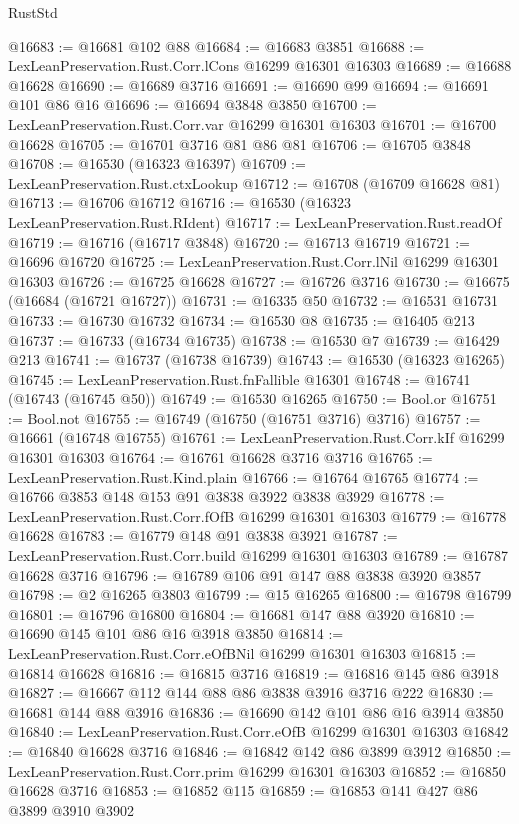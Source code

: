 \begin{lexlean}{RustStd}
\begin{coremodule}
@16683 := @16681 @102 @88
@16684 := @16683 @3851
@16688 := LexLeanPreservation.Rust.Corr.lCons @16299 @16301 @16303
@16689 := @16688 @16628
@16690 := @16689 @3716
@16691 := @16690 @99
@16694 := @16691 @101 @86 @16
@16696 := @16694 @3848 @3850
@16700 := LexLeanPreservation.Rust.Corr.var @16299 @16301 @16303
@16701 := @16700 @16628
@16705 := @16701 @3716 @81 @86 @81
@16706 := @16705 @3848
@16708 := @16530 (@16323 @16397)
@16709 := LexLeanPreservation.Rust.ctxLookup
@16712 := @16708 (@16709 @16628 @81)
@16713 := @16706 @16712
@16716 := @16530 (@16323 LexLeanPreservation.Rust.RIdent)
@16717 := LexLeanPreservation.Rust.readOf
@16719 := @16716 (@16717 @3848)
@16720 := @16713 @16719
@16721 := @16696 @16720
@16725 := LexLeanPreservation.Rust.Corr.lNil @16299 @16301 @16303
@16726 := @16725 @16628
@16727 := @16726 @3716
@16730 := @16675 (@16684 (@16721 @16727))
@16731 := @16335 @50
@16732 := @16531 @16731
@16733 := @16730 @16732
@16734 := @16530 @8
@16735 := @16405 @213
@16737 := @16733 (@16734 @16735)
@16738 := @16530 @7
@16739 := @16429 @213
@16741 := @16737 (@16738 @16739)
@16743 := @16530 (@16323 @16265)
@16745 := LexLeanPreservation.Rust.fnFallible @16301
@16748 := @16741 (@16743 (@16745 @50))
@16749 := @16530 @16265
@16750 := Bool.or
@16751 := Bool.not
@16755 := @16749 (@16750 (@16751 @3716) @3716)
@16757 := @16661 (@16748 @16755)
@16761 := LexLeanPreservation.Rust.Corr.kIf @16299 @16301 @16303
@16764 := @16761 @16628 @3716 @3716
@16765 := LexLeanPreservation.Rust.Kind.plain
@16766 := @16764 @16765
@16774 := @16766 @3853 @148 @153 @91 @3838 @3922 @3838 @3929
@16778 := LexLeanPreservation.Rust.Corr.fOfB @16299 @16301 @16303
@16779 := @16778 @16628
@16783 := @16779 @148 @91 @3838 @3921
@16787 := LexLeanPreservation.Rust.Corr.build @16299 @16301 @16303
@16789 := @16787 @16628 @3716
@16796 := @16789 @106 @91 @147 @88 @3838 @3920 @3857
@16798 := @2 @16265 @3803
@16799 := @15 @16265
@16800 := @16798 @16799
@16801 := @16796 @16800
@16804 := @16681 @147 @88 @3920
@16810 := @16690 @145 @101 @86 @16 @3918 @3850
@16814 := LexLeanPreservation.Rust.Corr.eOfBNil @16299 @16301 @16303
@16815 := @16814 @16628
@16816 := @16815 @3716
@16819 := @16816 @145 @86 @3918
@16827 := @16667 @112 @144 @88 @86 @3838 @3916 @3716 @222
@16830 := @16681 @144 @88 @3916
@16836 := @16690 @142 @101 @86 @16 @3914 @3850
@16840 := LexLeanPreservation.Rust.Corr.eOfB @16299 @16301 @16303
@16842 := @16840 @16628 @3716
@16846 := @16842 @142 @86 @3899 @3912
@16850 := LexLeanPreservation.Rust.Corr.prim @16299 @16301 @16303
@16852 := @16850 @16628 @3716
@16853 := @16852 @115
@16859 := @16853 @141 @427 @86 @3899 @3910 @3902

\end{coremodule}
\end{lexlean}
